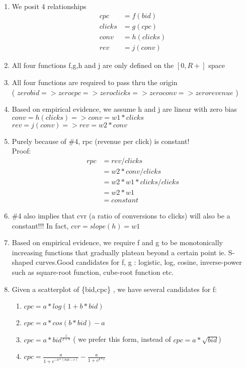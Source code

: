 \documentclass{article}
\begin{document}
	\	
	\begin{enumerate}
	\item We posit 4 relationships
		\begin{align*}
		cpc &= f(bid) \\
		clicks &= g(cpc) \\
		conv &= h(clicks) \\
		rev &= j(conv) 
		\end{align*}
		
	\item All four functions f,g,h and j are only defined on the $[0, R+]$ space
	
	\item All four functions are required to pass thru the origin \\( $zero bid => zero cpc => zero clicks => zero conv => zero revenue$ )
	
	\item Based on empirical evidence, we assume h and j are linear with zero bias
	\\ $conv = h(clicks) => conv = w1*clicks$
	\\ $rev = j(conv) => rev = w2 * conv$
	
	\item Purely because of \#4, rpc (revenue per click) is constant!
	\\ Proof:
	\begin{align*}
	rpc  &= rev/clicks \\
				&= w2* conv/clicks \\
				&= w2 * w1 * clicks/clicks \\
				&= w2 * w1 \\
				&= constant
	\end{align*}
	
	\item \#4 also implies that cvr (a ratio of conversions to clicks) will also be a constant!!! In fact, $cvr = slope(h) = w1$
	
	
	\item Based on empirical evidence, we require f and g to be monotonically increasing functions that gradually plateau beyond a certain point ie. S-shaped curves.Good candidates for f, g : logistic, log, cosine, inverse-power such as square-root function, cube-root function etc.

\item Given a scatterplot of \{bid,cpc\} , we have several candidates for f:

\begin{enumerate}
\item $cpc = a*log(1+b*bid)$
\item $cpc = a*cos(b*bid) - a$
\item $cpc = a*bid^\frac{1}{2+b}$ ( we prefer this form, instead of $cpc = a*\sqrt{bid}$)
\item $cpc = \frac{a}{1+e^{-b*{(bid-c)}}} - \frac{a}{1+e^{b*c}}$
\end{enumerate}


\end{enumerate}
\end{document}
